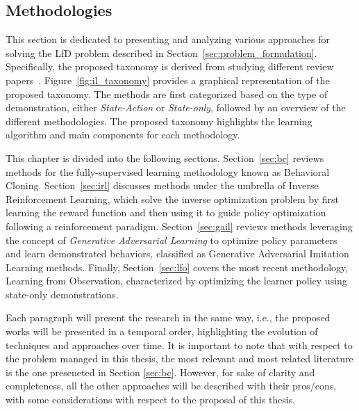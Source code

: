 \subsection{Methodologies}
\label{sec:lfd}
This section is dedicated to presenting and analyzing various approaches for solving the LfD problem described in Section~\ref{sec:problem_formulation}. Specifically,  the proposed taxonomy is derived from studying different review papers~\cite{kaelbling1996reinforcement_survey,argall2009robot_learning_from_demonstration,hussein2017imitation_learning_survey,fang2019survey,zheng2021imitation_progress_taxonomies_opportunities,zare2024survey}. Figure~\ref{fig:il_taxonomy} provides a graphical representation of the proposed taxonomy. The methods are first categorized based on the type of demonstration, either \textit{State-Action} or \textit{State-only}, followed by an overview of the different methodologies. The proposed taxonomy highlights the learning algorithm and main components for each methodology.

This chapter is divided into the following sections. Section~\ref{sec:bc} reviews methods for the fully-supervised learning methodology known as Behavioral Cloning. 
\newline Section~\ref{sec:irl} discusses methods under the umbrella of Inverse Reinforcement Learning, which solve the inverse optimization problem by first learning the reward function and then using it to guide policy optimization following a reinforcement paradigm.
\newline Section~\ref{sec:gail} reviews methods leveraging the concept of \textit{Generative Adversarial Learning} to optimize policy parameters and learn demonstrated behaviors, classified as Generative Adversarial Imitation Learning methods.
\newline Finally, Section~\ref{sec:lfo} covers the most recent methodology, Learning from Observation, characterized by optimizing the learner policy using state-only demonstrations.

Each paragraph will present the research in the same way, i.e., the proposed works will be presented in a temporal order, highlighting the evolution of techniques and approaches over time.
It is important to note that with respect to the problem managed in this thesis, the most relevant and most related literature is the one preseneted in Section \ref{sec:bc}. However, for sake of clarity and completeness, all the other approaches will be described with their pros/cons, with some considerations with respect to the proposal of this thesis.











